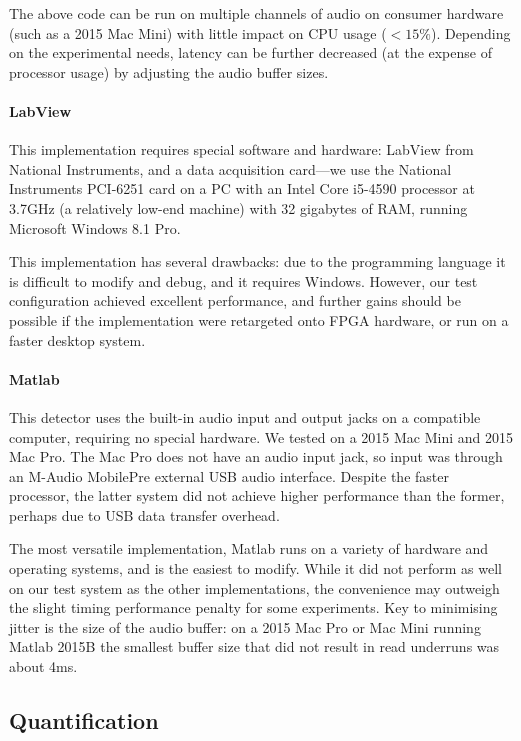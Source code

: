 \documentclass[10pt,letterpaper]{article}
\renewcommand{\subsubsection}[1]{\paragraph{#1}}
\begin{document}
The above code can be run on multiple channels of audio on 
consumer hardware (such as a 2015 Mac Mini) with little impact
on CPU usage ($<15\%$). Depending on the experimental needs, latency
can be further decreased (at the expense of processor usage) by
adjusting the audio buffer sizes.

\subsubsection{LabView}

This implementation requires special software and hardware: LabView from National Instruments, and a data acquisition card---we use the National Instruments PCI-6251 card on a PC with an Intel Core i5-4590 processor at 3.7GHz (a relatively low-end machine) with 32 gigabytes of RAM, running Microsoft Windows 8.1 Pro.

This implementation has several drawbacks: due to the programming language it is difficult to modify and debug, and it requires Windows. However, our test configuration achieved excellent performance, and further gains should be possible if the implementation were retargeted onto FPGA hardware, or run on a faster desktop system.

\subsubsection{Matlab}

This detector uses the built-in audio input and output jacks on a compatible computer, requiring no special hardware.  We tested on a 2015 Mac Mini and 2015 Mac Pro.  The Mac Pro does not have an audio input jack, so input was through an M-Audio MobilePre external USB audio interface.  Despite the faster processor, the latter system did not achieve higher performance than the former, perhaps due to USB data transfer overhead.

The most versatile implementation, Matlab runs on a variety of hardware and operating systems, and is the easiest to modify.  While it did not perform as well on our test system as the other implementations, the convenience may outweigh the slight timing performance penalty for some experiments.  Key to minimising jitter is the size of the audio buffer: on a 2015 Mac Pro or Mac Mini running Matlab 2015B the smallest buffer size that did not result in read underruns was about 4ms.

\subsection{Quantification}
\label{sec:quantify}
\end{document}
